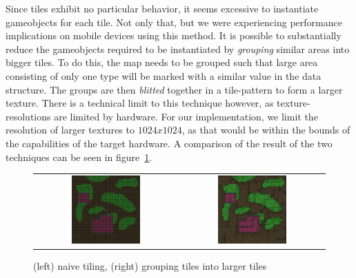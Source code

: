 Since tiles exhibit no particular behavior, it seems excessive to instantiate gameobjects for each tile.
Not only that, but we were experiencing performance implications on mobile devices using this method.
It is possible to substantially reduce the gameobjects required to be instantiated by \textit{grouping} similar areas into bigger tiles.
To do this, the map needs to be grouped such that large area consisting of only one type will be marked with a similar value in the data structure.
The groups are then \textit{blitted} together in a tile-pattern to form a larger texture.
There is a technical limit to this technique however, as texture-resolutions are limited by hardware. For our implementation, we limit the resolution of larger textures to $1024 x 1024$, as that would be within the bounds of the capabilities of the target hardware.
A comparison of the result of the two techniques can be seen in figure~\ref{fig:grouped_tiling_comparison}.
\begin{figure}[H]
    \centering
    \begin{tabular}{cc}
        \includegraphics[width=0.5\textwidth]{figures/generating_levels/naive-tile.png}
        &
        \includegraphics[width=0.5\textwidth]{figures/generating_levels/grouped-tile.png}
    \end{tabular}
    \caption{(left) naive tiling, (right) grouping tiles into larger tiles}\label{fig:grouped_tiling_comparison}
\end{figure}
